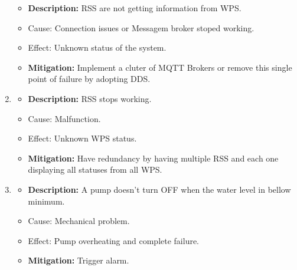 \documentclass[11pt]{article}
\begin{document}
\begin{enumerate}[leftmargin=4em, font=\small, label=\textbf{H-\arabic*:}]
		\begin{itemize}
		\setlength\itemsep{0em}
    		\item \textbf{Description:} RSS are not getting information from WPS.
		\item Cause: Connection issues or Messagem broker stoped working.
    		\item Effect: Unknown status of the system.
    		\item \textbf{Mitigation:} Implement a cluter of MQTT Brokers or remove this single point of failure by adopting DDS.
		\end{itemize} 
	\item 
		\begin{itemize}
		\setlength\itemsep{0em}
    		\item \textbf{Description:} RSS stops working.
		\item Cause: Malfunction.
    		\item Effect: Unknown WPS status.
    		\item \textbf{Mitigation:} Have redundancy by having multiple RSS and each one displaying all statuses from all WPS.
		\end{itemize} 
	\item 
		\begin{itemize}
		\setlength\itemsep{0em}
    		\item \textbf{Description:} A pump doesn't turn OFF when the water level in bellow minimum.
			\item Cause: Mechanical problem.
    		\item Effect: Pump overheating and complete failure.
    		\item \textbf{Mitigation:} Trigger alarm.
		\end{itemize} 
\end{enumerate}
\end{document}
